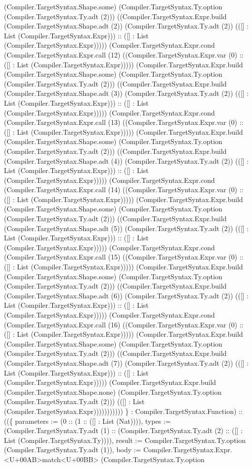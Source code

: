 \documentclass[11pt]{article}
\begin{document}
(Compiler.TargetSyntax.Shape.some) (Compiler.TargetSyntax.Ty.option (Compiler.TargetSyntax.Ty.adt (2))) ((Compiler.TargetSyntax.Expr.build (Compiler.TargetSyntax.Shape.adt (2)) (Compiler.TargetSyntax.Ty.adt (2)) (([] : List (Compiler.TargetSyntax.Expr))) :: ([] : List (Compiler.TargetSyntax.Expr))))) (Compiler.TargetSyntax.Expr.cond (Compiler.TargetSyntax.Expr.call (12) ((Compiler.TargetSyntax.Expr.var (0) :: ([] : List (Compiler.TargetSyntax.Expr))))) (Compiler.TargetSyntax.Expr.build (Compiler.TargetSyntax.Shape.some) (Compiler.TargetSyntax.Ty.option (Compiler.TargetSyntax.Ty.adt (2))) ((Compiler.TargetSyntax.Expr.build (Compiler.TargetSyntax.Shape.adt (3)) (Compiler.TargetSyntax.Ty.adt (2)) (([] : List (Compiler.TargetSyntax.Expr))) :: ([] : List (Compiler.TargetSyntax.Expr))))) (Compiler.TargetSyntax.Expr.cond (Compiler.TargetSyntax.Expr.call (13) ((Compiler.TargetSyntax.Expr.var (0) :: ([] : List (Compiler.TargetSyntax.Expr))))) (Compiler.TargetSyntax.Expr.build (Compiler.TargetSyntax.Shape.some) (Compiler.TargetSyntax.Ty.option (Compiler.TargetSyntax.Ty.adt (2))) ((Compiler.TargetSyntax.Expr.build (Compiler.TargetSyntax.Shape.adt (4)) (Compiler.TargetSyntax.Ty.adt (2)) (([] : List (Compiler.TargetSyntax.Expr))) :: ([] : List (Compiler.TargetSyntax.Expr))))) (Compiler.TargetSyntax.Expr.cond (Compiler.TargetSyntax.Expr.call (14) ((Compiler.TargetSyntax.Expr.var (0) :: ([] : List (Compiler.TargetSyntax.Expr))))) (Compiler.TargetSyntax.Expr.build (Compiler.TargetSyntax.Shape.some) (Compiler.TargetSyntax.Ty.option (Compiler.TargetSyntax.Ty.adt (2))) ((Compiler.TargetSyntax.Expr.build (Compiler.TargetSyntax.Shape.adt (5)) (Compiler.TargetSyntax.Ty.adt (2)) (([] : List (Compiler.TargetSyntax.Expr))) :: ([] : List (Compiler.TargetSyntax.Expr))))) (Compiler.TargetSyntax.Expr.cond (Compiler.TargetSyntax.Expr.call (15) ((Compiler.TargetSyntax.Expr.var (0) :: ([] : List (Compiler.TargetSyntax.Expr))))) (Compiler.TargetSyntax.Expr.build (Compiler.TargetSyntax.Shape.some) (Compiler.TargetSyntax.Ty.option (Compiler.TargetSyntax.Ty.adt (2))) ((Compiler.TargetSyntax.Expr.build (Compiler.TargetSyntax.Shape.adt (6)) (Compiler.TargetSyntax.Ty.adt (2)) (([] : List (Compiler.TargetSyntax.Expr))) :: ([] : List (Compiler.TargetSyntax.Expr))))) (Compiler.TargetSyntax.Expr.cond (Compiler.TargetSyntax.Expr.call (16) ((Compiler.TargetSyntax.Expr.var (0) :: ([] : List (Compiler.TargetSyntax.Expr))))) (Compiler.TargetSyntax.Expr.build (Compiler.TargetSyntax.Shape.some) (Compiler.TargetSyntax.Ty.option (Compiler.TargetSyntax.Ty.adt (2))) ((Compiler.TargetSyntax.Expr.build (Compiler.TargetSyntax.Shape.adt (7)) (Compiler.TargetSyntax.Ty.adt (2)) (([] : List (Compiler.TargetSyntax.Expr))) :: ([] : List (Compiler.TargetSyntax.Expr))))) (Compiler.TargetSyntax.Expr.build (Compiler.TargetSyntax.Shape.none) (Compiler.TargetSyntax.Ty.option (Compiler.TargetSyntax.Ty.adt (2))) (([] : List (Compiler.TargetSyntax.Expr))))))))))) \} : Compiler.TargetSyntax.Function) :: ((\{ parameters := (0 :: (1 :: ([] : List (Nat)))), types := (Compiler.TargetSyntax.Ty.adt (1) :: (Compiler.TargetSyntax.Ty.adt (2) :: ([] : List (Compiler.TargetSyntax.Ty)))), result := Compiler.TargetSyntax.Ty.option (Compiler.TargetSyntax.Ty.adt (1)), body := Compiler.TargetSyntax.Expr.<U+00AB>match<U+00BB> (Compiler.TargetSyntax.Ty.option 
\end{document}
